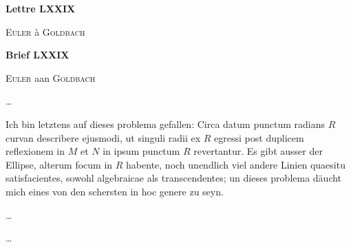 \documentclass[10pt,a4paper]{article}
\begin{document}
	
	\begin{paracol}{2}		
	
	\begin{center}
		\par {}
		\par {\bf Lettre LXXIX}
		\par {\textsc{Euler} à \textsc{Goldbach} }
	\end{center}
	\switchcolumn
	
	\begin{center}
		\par {}
		\par {\bf Brief LXXIX}
		\par {\textsc{Euler} aan \textsc{Goldbach} }
	\end{center}
	\switchcolumn*

	\par \ldots
	\par Ich bin letztens auf dieses problema gefallen: Circa datum punctum radians $R$ curvan describere ejusmodi, ut singuli radii ex $R$ egressi post duplicem reflexionem in $M$ et $N$ in ipsum punctum $R$ revertantur. Es gibt ausser der Ellipse, alterum focum in $R$ habente, noch unendlich viel andere Linien quaesitu satisfacientes, sowohl algebraicae als transcendentes; un dieses problema däucht mich eines von den schersten in hoc genere zu seyn.
	\par \ldots
			
	\switchcolumn
	\par \ldots
		
	\switchcolumn*
	

\end{paracol}
\end{document}
